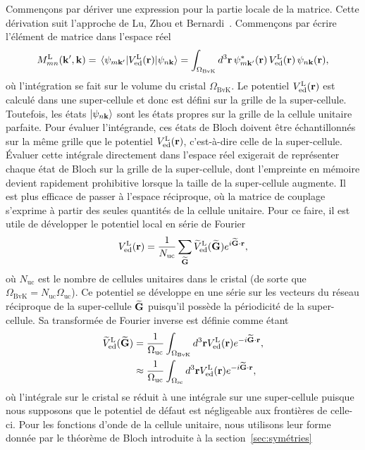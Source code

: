 Commençons par dériver une expression pour la partie locale de la matrice. Cette dérivation suit l'approche de Lu, Zhou et Bernardi~\cite{luEfficientInitioCalculations2019}. Commençons par écrire l'élément de matrice dans l'espace réel
\begin{equation}
    M^\text{L}_{mn}(\kv',\kv) = \matrixel{\psi_{m\kv'}}{V_\text{ed}^\text{L}(\rv)}{\psi_{n\kv}} = \int_{\Omega_\text{BvK}}d^3\rv\,\psi_{m\kv'}^*(\rv)\,V^\text{L}_\text{ed}(\rv)\,\psi_{n\kv}(\rv),\label{eqn:ML_réel}
\end{equation}
où l'intégration se fait sur le volume du cristal $\Omega_\text{BvK}$. Le potentiel $V_\text{ed}^\text{L}(\mathbf{r})$ est calculé dans une super-cellule et donc est défini sur la grille de la super-cellule. Toutefois, les états $\ket{\psi_{n\mathbf{k}}}$ sont les états propres sur la grille de la cellule unitaire parfaite. Pour évaluer l'intégrande, ces états de Bloch doivent être échantillonnés sur la même grille que le potentiel $V_\text{ed}^\text{L}(\mathbf{r})$, c'est-à-dire celle de la super-cellule. Évaluer cette intégrale directement dans l'espace réel exigerait de représenter chaque état de Bloch sur la grille de la super-cellule, dont l'empreinte en mémoire devient rapidement prohibitive lorsque la taille de la super-cellule augmente. Il est plus efficace de passer à l'espace réciproque, où la matrice de couplage s'exprime à partir des seules quantités de la cellule unitaire. Pour ce faire, il est utile de développer le potentiel local en série de Fourier
\begin{equation}
    V_\text{ed}^\text{L}(\mathbf{r}) = \frac{1}{N_\text{uc}}\sum_{\widetilde{\mathbf{G}}}\widetilde{V}_\text{ed}^\text{L}(\widetilde{\mathbf{G}})e^{i\widetilde{\mathbf{G}}\cdot\mathbf{r}},
\end{equation}
où $N_\text{uc}$ est le nombre de cellules unitaires dans le cristal (de sorte que $\Omega_\text{BvK}=N_\text{uc}\Omega_\text{uc}$). Ce potentiel se développe en une série sur les vecteurs du réseau réciproque de la super-cellule $\widetilde{\mathbf{G}}$ puisqu'il possède la périodicité de la super-cellule. Sa transformée de Fourier inverse est définie comme étant
\begin{align}
    \widetilde{V}_\text{ed}^\text{L}(\widetilde{\mathbf{G}}) &= \frac{1}{\Omega_\text{uc}}\int_{\Omega_\text{BvK}}d^3\mathbf{r} V_\text{ed}^\text{L}(\mathbf{r})e^{-i\widetilde{\mathbf{G}}\cdot\mathbf{r}},\\
    &\approx \frac{1}{\Omega_\text{uc}}\int_{\Omega_\text{sc}}d^3\mathbf{r} V_\text{ed}^\text{L}(\mathbf{r})e^{-i\widetilde{\mathbf{G}}\cdot\mathbf{r}},
\end{align}
où l'intégrale sur le cristal se réduit à une intégrale sur une super-cellule puisque nous supposons que le potentiel de défaut est négligeable aux frontières de celle-ci. Pour les fonctions d'onde de la cellule unitaire, nous utilisons leur forme donnée par le théorème de Bloch introduite à la section~\ref{sec:symétries}
